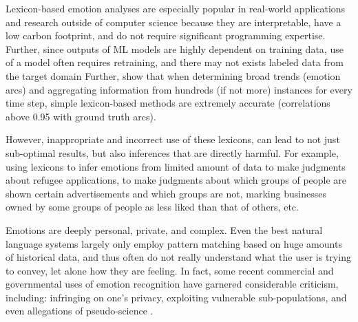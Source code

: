 \documentclass[11pt]{article}
\newcommand{\sm}[1]{{\color{black} #1}} %
\begin{document}

Lexicon-based emotion analyses are especially popular in real-world applications and research outside of computer science because they are interpretable, have a low carbon footprint, and do not require significant programming
expertise. Further, since outputs of ML models are highly dependent on training data, use of a model often requires retraining, and there may not exists labeled data from the target domain
Further,  show that when determining broad trends (emotion arcs) and aggregating information from hundreds (if not more) instances for every time step, simple lexicon-based methods are extremely accurate (correlations above 0.95 with ground truth arcs).

However, inappropriate and incorrect use of these lexicons, can lead to not just sub-optimal results, but also inferences that are directly harmful. \sm{For example, using lexicons to infer emotions from limited amount of data to make judgments about refugee applications, 
to make judgments about which groups of people are shown certain advertisements and which groups are not, 
marking businesses owned by some groups of people as less liked than that of others, etc.}

Emotions are deeply personal, private, and complex. Even the best natural language systems largely only employ pattern matching based on huge amounts of historical data, and thus often do not really understand what the user is %
trying to convey, let alone how they are %
feeling. 
In fact, some %
recent commercial and governmental uses of emotion recognition have garnered considerable criticism, including:
 infringing on one's privacy, exploiting vulnerable sub-populations, and %
 even allegations of pseudo-science \cite{Mohammad22AER,wakefield_2021,article19_2021,woensel_nevil_2019}.
\end{document}
